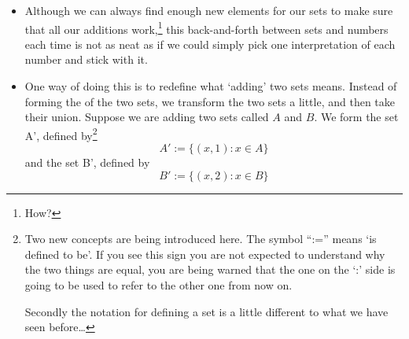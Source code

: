 \begin{itemize}
\item
Although we can always find enough new elements for our sets to make sure that all our additions work,\footnote{How?} this back-and-forth between sets and numbers each time is not as neat as if we could simply pick one interpretation of each number and stick with it.
\item
One way of doing this is to redefine what `adding' two sets means. Instead of forming the  of the two sets, we transform the two sets a little, and then take their union. Suppose we are adding two sets called $A$ and $B$. We form the set A', defined by\footnote{Two new concepts are being introduced here. The symbol ``:='' means `is defined to be'. If you see this sign you are not expected to understand why the two things are equal, you are being warned that the one on the `:' side is going to be used to refer to the other one from now on. 

Secondly the notation for defining a set is a little different to what we have seen before\ldots}
\[ A' := \{ (x,1) : x \in A \} \]
and the set B', defined by 
\[ B' := \{ (x,2) : x \in B \} \]
\end{itemize}
